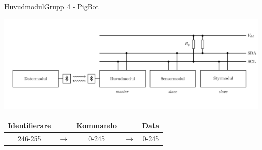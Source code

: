 \begin{frame}{Huvudmodul}{Grupp 4 - PigBot}
  \begin{center}
    \includegraphics[scale=0.5]{images/communication.pdf} 
    \pause
    \begin{longtable}{c c c c c}
      {Identifierare} & & {Kommando} & & {Data} \\ \hline
      246-255 & $\rightarrow$ & 0-245 & $\rightarrow$ & 0-245 
    \end{longtable}
  \end{center}
\end{frame}

